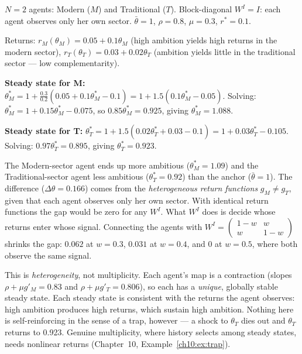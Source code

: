 \documentclass[../structural_economics_book.tex]{subfiles}
\begin{document}
\begin{example}\label{ch09:ex:two_steady}
$N = 2$ agents: Modern ($M$) and Traditional ($T$). Block-diagonal $W^I = I$: each agent observes only her own sector. $\bar{\theta} = 1$, $\rho = 0.8$, $\mu = 0.3$, $r^* = 0.1$.

Returns: $r_M(\theta_M) = 0.05 + 0.1\theta_M$ (high ambition yields high returns in the modern sector), $r_T(\theta_T) = 0.03 + 0.02\theta_T$ (ambition yields little in the traditional sector --- low complementarity).

\textbf{Steady state for M:} $\theta_M^* = 1 + \frac{0.3}{0.2}(0.05 + 0.1\theta_M^* - 0.1) = 1 + 1.5(0.1\theta_M^* - 0.05)$. Solving: $\theta_M^* = 1 + 0.15\theta_M^* - 0.075$, so $0.85\theta_M^* = 0.925$, giving $\theta_M^* = 1.088$.

\textbf{Steady state for T:} $\theta_T^* = 1 + 1.5(0.02\theta_T^* + 0.03 - 0.1) = 1 + 0.03\theta_T^* - 0.105$. Solving: $0.97\theta_T^* = 0.895$, giving $\theta_T^* = 0.923$.

The Modern-sector agent ends up more ambitious ($\theta_M^* = 1.09$) and the Traditional-sector agent less ambitious ($\theta_T^* = 0.92$) than the anchor ($\bar{\theta} = 1$). The difference ($\Delta\theta = 0.166$) comes from the \textit{heterogeneous return functions} $g_M \neq g_T$, given that each agent observes only her own sector. With identical return functions the gap would be zero for any $W^I$. What $W^I$ does is decide whose returns enter whose signal. Connecting the agents with $W^I = \begin{pmatrix} 1-w & w \\ w & 1-w \end{pmatrix}$ shrinks the gap: $0.062$ at $w = 0.3$, $0.031$ at $w = 0.4$, and $0$ at $w = 0.5$, where both observe the same signal.

This is \textit{heterogeneity}, not multiplicity. Each agent's map is a contraction (slopes $\rho + \mu g'_M = 0.83$ and $\rho + \mu g'_T = 0.806$), so each has a \textit{unique}, globally stable steady state. Each steady state is consistent with the returns the agent observes: high ambition produces high returns, which sustain high ambition. Nothing here is self-reinforcing in the sense of a trap, however --- a shock to $\theta_T$ dies out and $\theta_T$ returns to 0.923. Genuine multiplicity, where history selects among steady states, needs nonlinear returns (Chapter~10, Example~\ref{ch10:ex:trap}).
\end{example}
\end{document}

